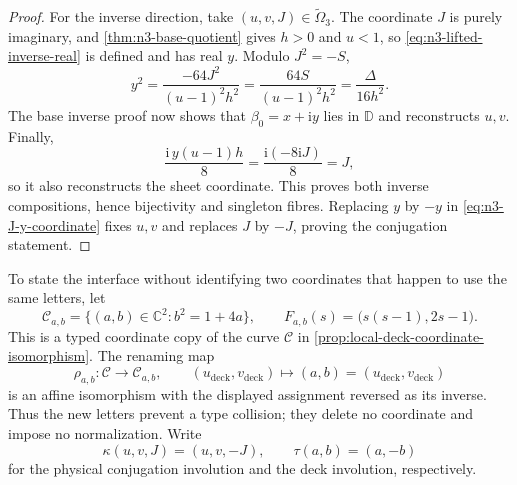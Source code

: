 \begin{proof}
For the inverse direction, take $(u,v,J)\in\widetilde\Omega_3$.  The coordinate
$J$ is purely imaginary, and \cref{thm:n3-base-quotient} gives $h>0$ and $u<1$,
so \eqref{eq:n3-lifted-inverse-real} is defined and has real $y$.  Modulo
$J^2=-S$,
\[
 y^2
 =\frac{-64J^2}{(u-1)^2h^2}
 =\frac{64S}{(u-1)^2h^2}
 =\frac{\Delta}{16h^2}.
\]
The base inverse proof now shows that $\beta_0=x+\mathrm i y$ lies in
$\mathbb D$ and reconstructs $u,v$.  Finally,
\[
 \frac{\mathrm i\,y(u-1)h}{8}
 =\frac{\mathrm i(-8\mathrm iJ)}8=J,
\]
so it also reconstructs the sheet coordinate.  This proves both inverse
compositions, hence bijectivity and singleton fibres.  Replacing $y$ by $-y$
in \eqref{eq:n3-J-y-coordinate} fixes $u,v$ and replaces $J$ by $-J$, proving
the conjugation statement.
\end{proof}

To state the interface without identifying two coordinates that happen to use the
same letters, let
\[
 \mathcal C_{a,b}=\{(a,b)\in\mathbb C^2:b^2=1+4a\},
 \qquad
 F_{a,b}(s)=\bigl(s(s-1),2s-1\bigr).
\]
This is a typed coordinate copy of the curve $\mathcal C$ in
\cref{prop:local-deck-coordinate-isomorphism}.  The renaming map
\[
 \rho_{a,b}:\mathcal C\longrightarrow\mathcal C_{a,b},
 \qquad
 (u_{\mathrm{deck}},v_{\mathrm{deck}})\longmapsto
 (a,b)=(u_{\mathrm{deck}},v_{\mathrm{deck}})
\]
is an affine isomorphism with the displayed assignment reversed as its inverse.
Thus the new letters prevent a type collision; they delete no coordinate and impose
no normalization.  Write
\[
 \kappa(u,v,J)=(u,v,-J),
 \qquad
 \tau(a,b)=(a,-b)
\]
for the physical conjugation involution and the deck involution, respectively.

